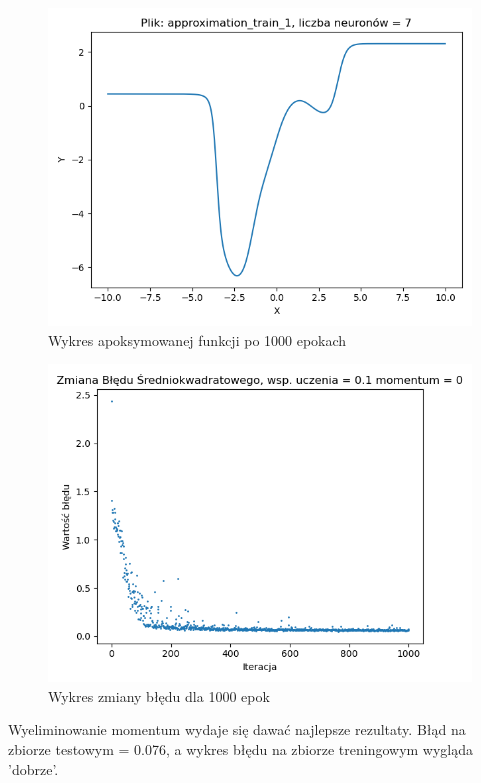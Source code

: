 \documentclass[12pt]{article}
\begin{document}
\begin{figure}[!htb]
 \centering
 \includegraphics[width=12cm]{FunctionPlot7Neuronmomentum00.png}
 \caption{Wykres apoksymowanej funkcji po 1000 epokach}
 \vspace{-0.3cm}
 \label{WykresFun10}
\end{figure}

\begin{figure}[!htb]
 \centering
 \includegraphics[width=12cm]{ZmianaBledu7Neuronmomentum00.png}
 \vspace{-0.3cm}
 \caption{Wykres zmiany błędu dla 1000 epok}
 \label{WykresBlad10}
\end{figure}


\newpage
Wyeliminowanie momentum wydaje się dawać najlepsze rezultaty. Błąd na zbiorze testowym = 0.076, a wykres błędu na zbiorze treningowym wygląda 'dobrze'.
\end{document}
